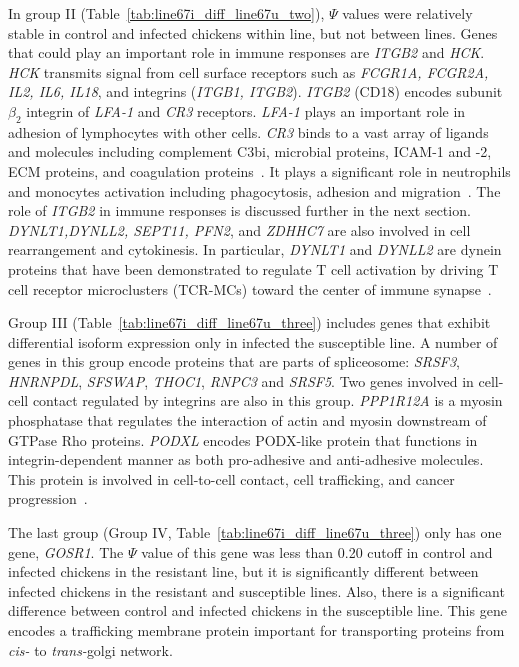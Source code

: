 \documentclass[10pt]{article}
\begin{document}
In group II (Table~\ref{tab:line67i_diff_line67u_two}), $\Psi$
values were relatively stable in control and infected chickens
within line, but not between lines.  Genes that could play an
important role in immune responses are {\em ITGB2} and {\em HCK}.
{\em HCK} transmits signal from cell surface receptors such as
{\em FCGR1A, FCGR2A, IL2, IL6, IL18}, and integrins ({\em ITGB1,
ITGB2}).  {\em ITGB2} (CD18) encodes subunit $\beta_{2}$ integrin
of {\em LFA-1} and {\em CR3} receptors.  {\em LFA-1} plays an
important role in adhesion of lymphocytes with other cells.  {\em
CR3} binds to a vast array of ligands and molecules including
complement C3bi, microbial proteins, ICAM-1 and -2, ECM proteins,
and coagulation proteins~\cite{}.  It plays a significant role in
neutrophils and monocytes activation including phagocytosis,
adhesion and migration~\cite{}.  The role of {\em ITGB2} in
immune responses is discussed further in the next section.  {\em
DYNLT1,DYNLL2, SEPT11, PFN2}, and {\em ZDHHC7} are also involved
in cell rearrangement and cytokinesis.  In particular, {\em
DYNLT1} and {\em DYNLL2} are dynein proteins that have been
demonstrated to regulate T cell activation by driving T cell
receptor microclusters (TCR-MCs) toward the center of immune
synapse~\cite{hashimoto2011dynein}.

Group III (Table~\ref{tab:line67i_diff_line67u_three}) includes
genes that exhibit differential isoform expression only in
infected the susceptible line.  A number of genes in this group
encode proteins that are parts of spliceosome: {\em SRSF3}, {\em
HNRNPDL}, {\em SFSWAP}, {\em THOC1}, {\em RNPC3} and {\em SRSF5}.
Two genes involved in cell-cell contact regulated by integrins
are also in this group.  {\em PPP1R12A} is a myosin phosphatase
that regulates the interaction of actin and myosin downstream of
GTPase Rho proteins.  {\em PODXL} encodes PODX-like protein that
functions in integrin-dependent manner as both pro-adhesive and
anti-adhesive molecules.  This protein is involved in
cell-to-cell contact, cell trafficking, and cancer
progression~\cite{nielsen2009role,somasiri2004overexpression}.

The last group (Group IV,
Table~\ref{tab:line67i_diff_line67u_three}) only has one gene,
{\em GOSR1}.  The $\Psi$ value of this gene was less than 0.20
cutoff in control and infected chickens in the resistant line,
but it is significantly different between infected chickens in
the resistant and susceptible lines.  Also, there is a significant
difference between control and infected chickens in the
susceptible line.  This gene encodes a trafficking membrane
protein important for transporting proteins from {\em cis-} to
{\em trans-}golgi network.
\end{document}
